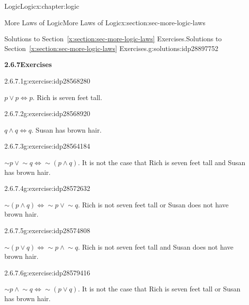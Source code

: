 \documentclass[twoside,10pt,]{book}
\newcommand{\xreffont}{\relax}
\numberwithin{equation}{section}
\begin{document}
\begin{chapterptx}{Logic}{}{Logic}{}{}{x:chapter:logic}
\begin{sectionptx}{More Laws of Logic}{}{More Laws of Logic}{}{}{x:section:sec-more-logic-laws}
\begin{solutions-subsection}{Solutions to Section~{\xreffont\ref*{x:section:sec-more-logic-laws}} Exercises.}{}{Solutions to Section~{\xreffont\ref*{x:section:sec-more-logic-laws}} Exercises.}{}{}{g:solutions:idp28897752}
\par\medskip
\noindent\textbf{\normalsize{}2.6.7\space\textperiodcentered\space{}Exercises}
\begin{exercisegroup}
\begin{divisionsolutioneg}{2.6.7.1}{}{g:exercise:idp28568280}%
\par\smallskip%
\noindent\hypertarget{g:solution:idp28565336-main}{}\(p {\vee}{} p  {\Leftrightarrow}{}  p\).  Rich is seven feet tall.\end{divisionsolutioneg}%
\begin{divisionsolutioneg}{2.6.7.2}{}{g:exercise:idp28568920}%
\par\smallskip%
\noindent\hypertarget{g:solution:idp28571224-main}{}\(q  {\wedge}{}  q  {\Leftrightarrow}{}  q\).  Susan has brown hair.\end{divisionsolutioneg}%
\begin{divisionsolutioneg}{2.6.7.3}{}{g:exercise:idp28564184}%
\par\smallskip%
\noindent\hypertarget{g:solution:idp28579800-main}{}\(\sim\!{p}{} {\vee}{} \sim\!{q}{}  {\Leftrightarrow}{}  \sim\!{(p {\wedge}{} q)}\).  It is not the case that Rich is seven feet tall and Susan has brown hair.\end{divisionsolutioneg}%
\begin{divisionsolutioneg}{2.6.7.4}{}{g:exercise:idp28572632}%
\par\smallskip%
\noindent\hypertarget{g:solution:idp28575448-main}{}\(\sim\!{(p {\wedge}{} q)} {\Leftrightarrow}{} \sim\!{p}{} {\vee}{}  \sim\!{q}{}\).  Rich is not seven feet tall or Susan does not have brown hair.\end{divisionsolutioneg}%
\begin{divisionsolutioneg}{2.6.7.5}{}{g:exercise:idp28574808}%
\par\smallskip%
\noindent\hypertarget{g:solution:idp28577624-main}{}\(\sim\!{(p {\vee}{} q)}  {\Leftrightarrow}{}  \sim\!{p}{} {\wedge}{}  \sim\!{q}{}\).  Rich is not seven feet tall and Susan does not have brown hair.\end{divisionsolutioneg}%
\begin{divisionsolutioneg}{2.6.7.6}{}{g:exercise:idp28579416}%
\par\smallskip%
\noindent\hypertarget{g:solution:idp28575576-main}{}\(\sim\!{p}{} {\wedge}{}  \sim\!{q}{}    {\Leftrightarrow}{}  \sim\!{(p {\vee}{} q)}\).  It is not the case that Rich is seven feet tall or Susan has brown hair.\end{divisionsolutioneg}%

\end{exercisegroup}
\end{solutions-subsection}
\end{sectionptx}
\end{chapterptx}
\end{document}
